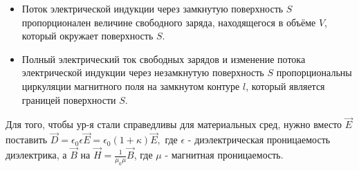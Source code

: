 \documentclass[__main__.tex]{subfiles}
\begin{document}
\begin{itemize}
    \item
          Поток электрической индукции через замкнутую поверхность $S$ пропорционален величине свободного заряда, находящегося в объёме $V$, который окружает поверхность $S$.
    \item
          Полный электрический ток свободных зарядов и изменение потока электрической индукции через незамкнутую поверхность $S$ пропорциональны циркуляции магнитного поля на замкнутом контуре $l$, который является границей поверхности $S$.
\end{itemize}
Для того, чтобы ур-я стали справедливы для материальных сред, нужно вместо $\vec{E}$ поставить $\vec{D}=\epsilon_0\epsilon\vec E = \epsilon_0(1+\kappa)\vec E,$ где $\epsilon$ - диэлектрическая проницаемость диэлектрика, а $\vec B$ на $\vec H = \frac{1}{\mu_0\mu}\vec B$, где $\mu$ - магнитная проницаемость.
\end{document}
